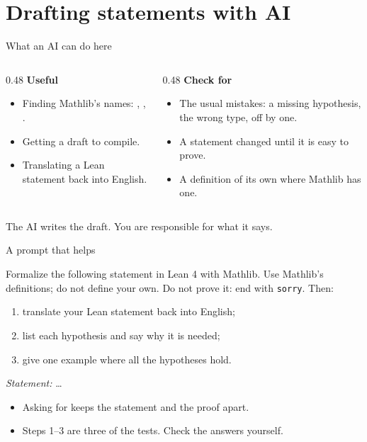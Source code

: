 \documentclass[10pt, aspectratio=169]{beamer}
\begin{document}
\section{Drafting statements with AI}

\begin{frame}[fragile]{What an AI can do here}
\begin{columns}[T]
\begin{column}{0.48\textwidth}
\textbf{\color{okgreen}Useful}
\begin{itemize}
\item Finding Mathlib's names: , , .
\item Getting a draft to compile.
\item Translating a Lean statement back into English.
\end{itemize}
\end{column}
\begin{column}{0.48\textwidth}
\textbf{\color{alertred}Check for}
\begin{itemize}
\item The usual mistakes: a missing hypothesis, the wrong type, off by one.
\item A statement changed until it is easy to prove.
\item A definition of its own where Mathlib has one.
\end{itemize}
\end{column}
\end{columns}

\vspace{0.8em}
\begin{keypoint}
\normalsize The AI writes the draft. You are responsible for what it says.
\end{keypoint}
\end{frame}

\begin{frame}[fragile]{A prompt that helps}
\begin{paper}[Prompt]
\small Formalize the following statement in Lean 4 with Mathlib. Use Mathlib's definitions; do not define your own. Do not prove it: end with \texttt{sorry}. Then:
\begin{enumerate}
\item translate your Lean statement back into English;
\item list each hypothesis and say why it is needed;
\item give one example where all the hypotheses hold.
\end{enumerate}
\emph{Statement:} \dots
\end{paper}

\vspace{0.4em}
\begin{itemize}
\item Asking for  keeps the statement and the proof apart.
\item Steps 1--3 are three of the tests. Check the answers yourself.
\end{itemize}
\end{frame}
\end{document}
